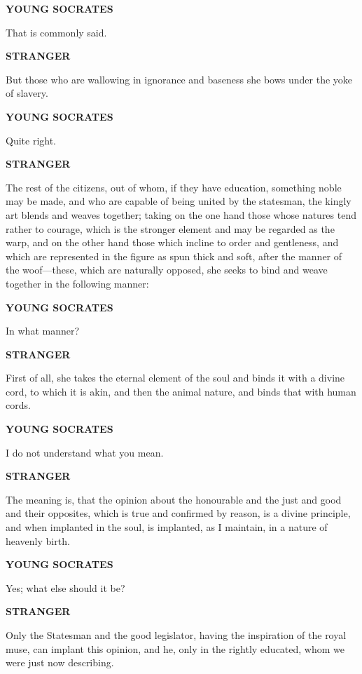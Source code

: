 \documentclass[11pt,letter]{article}
\begin{document}
\par \textbf{YOUNG SOCRATES}
\par   That is commonly said.

\par \textbf{STRANGER}
\par   But those who are wallowing in ignorance and baseness she bows under the yoke of slavery.

\par \textbf{YOUNG SOCRATES}
\par   Quite right.

\par \textbf{STRANGER}
\par   The rest of the citizens, out of whom, if they have education, something noble may be made, and who are capable of being united by the statesman, the kingly art blends and weaves together; taking on the one hand those whose natures tend rather to courage, which is the stronger element and may be regarded as the warp, and on the other hand those which incline to order and gentleness, and which are represented in the figure as spun thick and soft, after the manner of the woof—these, which are naturally opposed, she seeks to bind and weave together in the following manner:

\par \textbf{YOUNG SOCRATES}
\par   In what manner?

\par \textbf{STRANGER}
\par   First of all, she takes the eternal element of the soul and binds it with a divine cord, to which it is akin, and then the animal nature, and binds that with human cords.

\par \textbf{YOUNG SOCRATES}
\par   I do not understand what you mean.

\par \textbf{STRANGER}
\par   The meaning is, that the opinion about the honourable and the just and good and their opposites, which is true and confirmed by reason, is a divine principle, and when implanted in the soul, is implanted, as I maintain, in a nature of heavenly birth.

\par \textbf{YOUNG SOCRATES}
\par   Yes; what else should it be?

\par \textbf{STRANGER}
\par   Only the Statesman and the good legislator, having the inspiration of the royal muse, can implant this opinion, and he, only in the rightly educated, whom we were just now describing.
\end{document}
